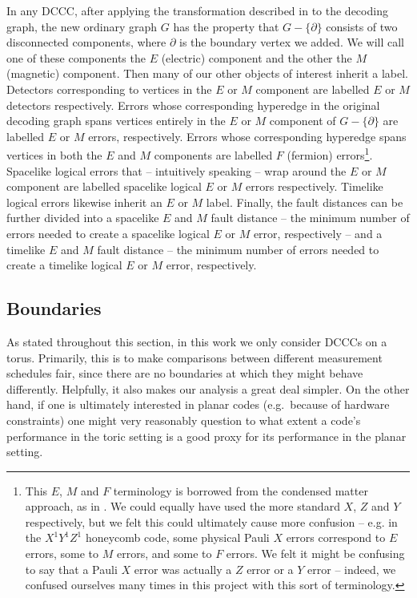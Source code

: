 In any DCCC, after applying the transformation described in  to the decoding graph,
the new ordinary graph $G$ has the property that $G - \{\partial\}$ consists of two disconnected components,
where $\partial$ is the boundary vertex we added.
We will call one of these components the $E$ (electric) component and the other the $M$ (magnetic) component.
Then many of our other objects of interest inherit a label.
Detectors corresponding to vertices in the $E$ or $M$ component are labelled $E$ or $M$ detectors respectively.
Errors whose corresponding hyperedge in the original decoding graph spans vertices entirely in the $E$ or $M$ component of $G - \{\partial\}$
are labelled $E$ or $M$ errors, respectively.
Errors whose corresponding hyperedge spans vertices in both the $E$ and $M$ components are labelled $F$ (fermion) errors\footnote{%
    This $E$, $M$ and $F$ terminology is borrowed from the condensed matter approach, as in .
    We could equally have used the more standard $X$, $Z$ and $Y$ respectively, but we felt this could ultimately cause more confusion -- e.g. in the $X^1 Y^1 Z^1$ honeycomb code, some physical Pauli $X$ errors correspond to $E$ errors, some to $M$ errors, and some to $F$ errors.
    We felt it might be confusing to say that a Pauli $X$ error was actually a $Z$ error or a $Y$ error -- indeed, we confused ourselves many times in this project with this sort of terminology.}.
Spacelike logical errors that -- intuitively speaking -- wrap around the $E$ or $M$ component are labelled spacelike logical $E$ or $M$ errors respectively.
Timelike logical errors likewise inherit an $E$ or $M$ label.
Finally, the fault distances can be further divided into a spacelike $E$ and $M$ fault distance -- the minimum number of errors needed to create a spacelike logical $E$ or $M$ error, respectively -- and a timelike $E$ and $M$ fault distance -- the minimum number of errors needed to create a timelike logical $E$ or $M$ error, respectively.

\subsection{Boundaries}\label{subsec:boundaries}

As stated throughout this section, in this work we only consider DCCCs on a torus. Primarily, this is to make comparisons between different measurement schedules fair, since there are no boundaries at which they might behave differently. Helpfully, it also makes our analysis a great deal simpler. On the other hand, if one is ultimately interested in planar codes (e.g.\ because of hardware constraints) one might very reasonably question to what extent a code's performance in the toric setting is a good proxy for its performance in the planar setting.

